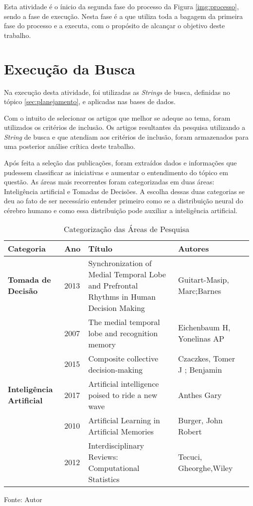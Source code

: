 Esta atividade é o ínicio da segunda fase do processo da Figura \ref{img:processo}, sendo a fase de execução. Nesta fase é a que utiliza toda a bagagem da primeira fase do processo e a executa, com o propósito de alcançar o objetivo deste trabalho.

\section{Execução da Busca}

Na execução desta atividade, foi utilizadas as \textit{Strings} de busca, definidas no tópico \ref{sec:planejamento}, e aplicadas nas bases de dados.

Com o intuito de selecionar os artigos que melhor se adeque ao tema, foram utilizados os critérios de inclusão. Os artigos resultantes da pesquisa utilizando a \textit{String} de busca e que atendiam aos critérios de inclusão, foram armazenados para uma posterior análise crítica deste trabalho.

Após feita a seleção das publicações, foram extraídos dados e informações que pudessem classificar as iniciativas e aumentar o entendimento do tópico em questão. As áreas mais recorrentes foram categorizadas em duas áreas: Inteligência artificial e Tomadas de Decisões. A escolha dessas duas categorias se deu ao fato de ser necessário entender primeiro como se a distribuição neural do cérebro humano e como essa distribuição pode auxiliar a inteligência artificial.

\begin{table}[h]
\centering
\begin{tabular}{ | l | l | p{5cm} | l | p{10cm} |}
\hline
\rowcolor[HTML]{F8FF00} 
{\color[HTML]{000000} \textbf{Categoria}} & \textbf{Ano} & \textbf{Título} & \textbf{Autores}        \\ \hline
{\cellcolor[HTML]{34FF34}}\textbf{Tomada de Decisão}               & 2013                   & Synchronization of Medial Temporal Lobe and Prefrontal Rhythms in Human Decision Making    & Guitart-Masip, Marc;Barnes          \\ \hline
 & 2007 & The medial temporal lobe and recognition memory & Eichenbaum H, Yonelinas AP\\ \hline
 & 2015 & Composite collective decision-making & Czaczkes, Tomer J ; Benjamin \\ \hline
 {\cellcolor[HTML]{34FF34}}\textbf{Inteligência Artificial} & 2017 & Artificial intelligence poised to ride a new wave & Anthes Gary \\ \hline
 & 2010 & Artificial Learning in Artificial Memories & Burger, John Robert \\ \hline
 & 2012 & Interdisciplinary Reviews: Computational Statistics & Tecuci, Gheorghe,Wiley \\ \hline
\end{tabular}
\caption{Categorização das Áreas de Pesquisa}
Fonte: Autor
\label{tab:categorizacao}
\end{table}